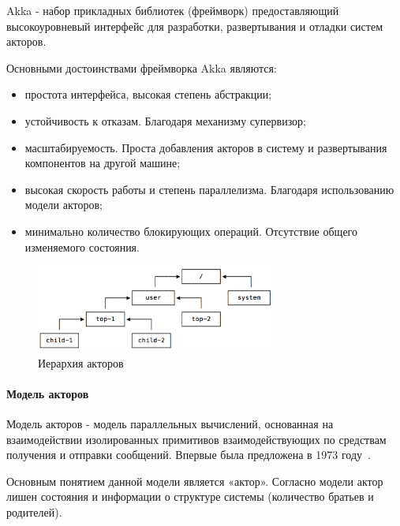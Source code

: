 Akka - набор прикладных библиотек (фреймворк) предоставляющий высокоуровневый интерфейс для разработки, развертывания и отладки систем акторов.

Основными достоинствами фреймворка Akka являются:
\begin{itemize}
  \item простота интерфейса, высокая степень абстракции;
  \item устойчивость к отказам. Благодаря механизму супервизор;
  \item масштабируемость. Проста добавления акторов в систему и развертывания компонентов на другой машине;
  \item высокая скорость работы и степень параллелизма. Благодаря использованию модели акторов;
  \item минимально количество блокирующих операций. Отсутствие общего изменяемого состояния.
\end{itemize}

\begin{figure}[ht]
    \centering
    \includegraphics[width=0.7\textwidth]{figures/actors_hier.png}
    \caption{Иерархия акторов}
    \label{fig:techs:akka:actor_hierar}
\end{figure}

\paragraph{Модель акторов}
\label{sec:techs:akka:actor_model}
Модель акторов - модель параллельных вычислений, основанная на взаимодействии изолированных примитивов взаимодействующих по средствам получения и отправки сообщений. Впервые была предложена в 1973 году~\cite{hewitt_bishop_steiger_actor_model}.

Основным понятием данной модели является «актор». Согласно модели актор лишен состояния и информации о структуре системы (количество братьев и родителей).

